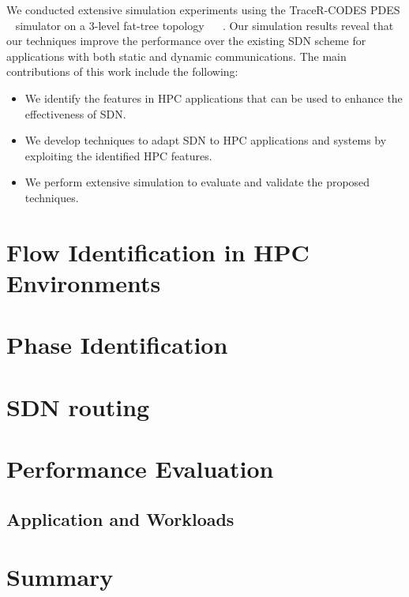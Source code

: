 We conducted extensive simulation experiments using the
TraceR-CODES
\cite{jain2016evaluating,mubarak2016enabling,jain2017predicting}
PDES ~\cite{fujimoto1990parallel} simulator on a 3-level
fat-tree topology ~\cite{leiserson1985fat} ~\cite{al2008scalable}. Our
simulation results reveal that our techniques improve the performance
over the existing SDN
scheme for applications with both static and dynamic communications.
The main contributions of this work include the following:
%
\begin{itemize}
\item We identify the features in HPC applications that can be used
  to enhance the effectiveness of SDN.
\item We develop techniques to adapt SDN to HPC applications and
  systems by exploiting the identified HPC features.
\item We perform extensive simulation to evaluate and validate
  the proposed techniques.
\end{itemize}


\section{Flow Identification in HPC Environments}
\label{sec:flow_identification}

\section{Phase Identification}
\label{sec:phase_identification}

\section{SDN routing}
\label{sec:sdn_routing}

\section{Performance Evaluation}

\subsection{Application and Workloads}


\section{Summary}

